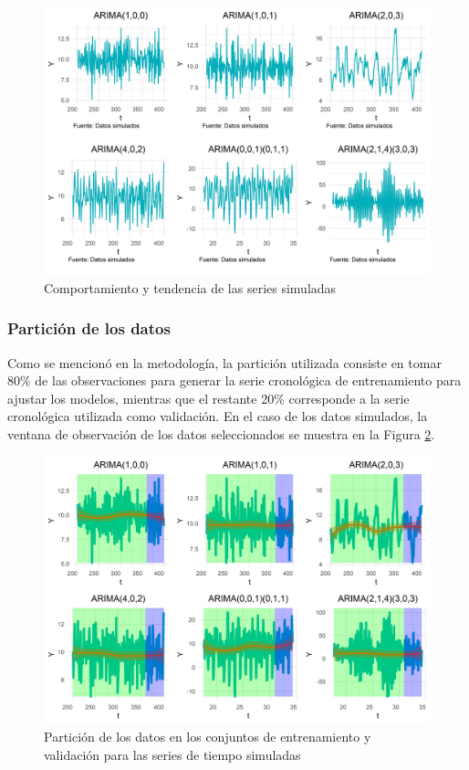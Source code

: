 \documentclass[
]{article}
\begin{document}
\begin{figure}[H]
\includegraphics[width=1\linewidth,height=1\textheight]{Tesis_files/figure-latex/series_simuladas-1} \caption{Comportamiento y tendencia de las series simuladas}\label{fig:series_simuladas}
\end{figure}

\subsubsection{Partición de los datos}

Como se mencionó en la metodología, la partición utilizada consiste en
tomar 80\% de las observaciones para generar la serie cronológica de
entrenamiento para ajustar los modelos, mientras que el restante 20\%
corresponde a la serie cronológica utilizada como validación. En el caso
de los datos simulados, la ventana de observación de los datos
seleccionados se muestra en la Figura
\ref{fig:particion_series_simuladas}.

\begin{figure}[H]
\includegraphics[width=1\linewidth,height=1\textheight]{Tesis_files/figure-latex/particion_series_simuladas-1} \caption{Partición de los datos en los conjuntos de entrenamiento y validación para las series de tiempo simuladas}\label{fig:particion_series_simuladas}
\end{figure}
\end{document}
